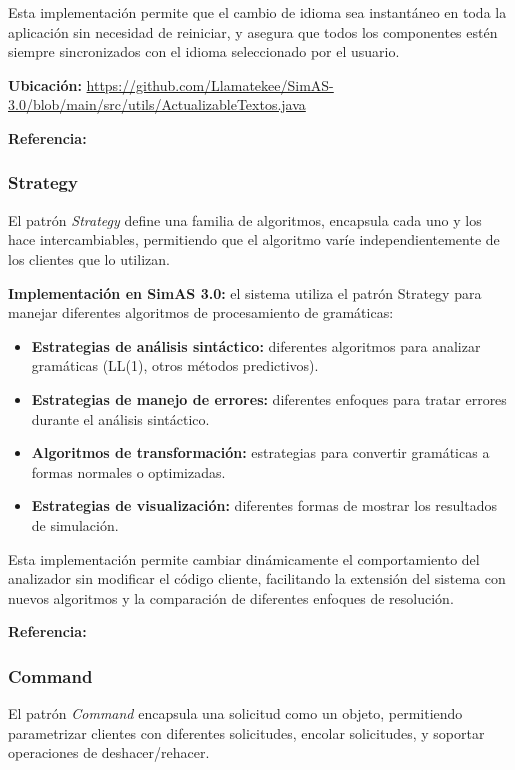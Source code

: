 Esta implementación permite que el cambio de idioma sea instantáneo en toda la aplicación sin necesidad de reiniciar, y asegura que todos los componentes estén siempre sincronizados con el idioma seleccionado por el usuario.

\textbf{Ubicación:} \url{https://github.com/Llamatekee/SimAS-3.0/blob/main/src/utils/ActualizableTextos.java}

\textbf{Referencia:} \cite[pp. 293-303]{gamma1994design}

\subsubsection{Strategy}

El patrón \textit{Strategy} define una familia de algoritmos, encapsula cada uno y los hace intercambiables, permitiendo que el algoritmo varíe independientemente de los clientes que lo utilizan.

\textbf{Implementación en SimAS 3.0:} el sistema utiliza el patrón Strategy para manejar diferentes algoritmos de procesamiento de gramáticas:

\begin{itemize}
    \item \textbf{Estrategias de análisis sintáctico:} diferentes algoritmos para analizar gramáticas (LL(1), otros métodos predictivos).
    \item \textbf{Estrategias de manejo de errores:} diferentes enfoques para tratar errores durante el análisis sintáctico.
    \item \textbf{Algoritmos de transformación:} estrategias para convertir gramáticas a formas normales o optimizadas.
    \item \textbf{Estrategias de visualización:} diferentes formas de mostrar los resultados de simulación.
\end{itemize}

Esta implementación permite cambiar dinámicamente el comportamiento del analizador sin modificar el código cliente, facilitando la extensión del sistema con nuevos algoritmos y la comparación de diferentes enfoques de resolución.

\textbf{Referencia:} \cite[pp. 315-323]{gamma1994design}

\subsubsection{Command}

El patrón \textit{Command} encapsula una solicitud como un objeto, permitiendo parametrizar clientes con diferentes solicitudes, encolar solicitudes, y soportar operaciones de deshacer/rehacer.

